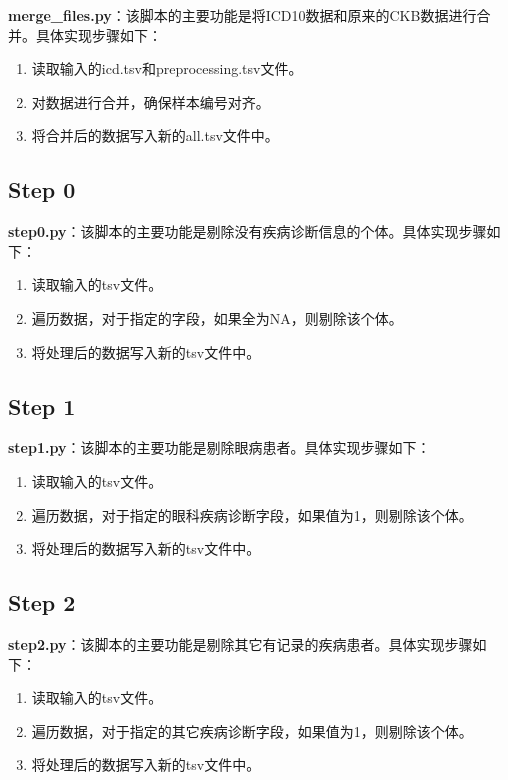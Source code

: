 \documentclass[UTF8]{report}
\theoremstyle{MyLineTheoremStyle} %
\theoremstyle{MyBlockTheoremStyle} %
\theoremstyle{MySubsubsectionStyle} %
\begin{document}
\textbf{merge\_files.py}：该脚本的主要功能是将ICD10数据和原来的CKB数据进行合并。具体实现步骤如下：
\begin{enumerate}
    \item 读取输入的icd.tsv和preprocessing.tsv文件。
    \item 对数据进行合并，确保样本编号对齐。
    \item 将合并后的数据写入新的all.tsv文件中。
\end{enumerate}

\subsection*{Step 0}

\textbf{step0.py}：该脚本的主要功能是剔除没有疾病诊断信息的个体。具体实现步骤如下：
\begin{enumerate}
    \item 读取输入的tsv文件。
    \item 遍历数据，对于指定的字段，如果全为NA，则剔除该个体。
    \item 将处理后的数据写入新的tsv文件中。
\end{enumerate}

\subsection*{Step 1}

\textbf{step1.py}：该脚本的主要功能是剔除眼病患者。具体实现步骤如下：
\begin{enumerate}
    \item 读取输入的tsv文件。
    \item 遍历数据，对于指定的眼科疾病诊断字段，如果值为1，则剔除该个体。
    \item 将处理后的数据写入新的tsv文件中。
\end{enumerate}

\subsection*{Step 2}

\textbf{step2.py}：该脚本的主要功能是剔除其它有记录的疾病患者。具体实现步骤如下：
\begin{enumerate}
    \item 读取输入的tsv文件。
    \item 遍历数据，对于指定的其它疾病诊断字段，如果值为1，则剔除该个体。
    \item 将处理后的数据写入新的tsv文件中。
\end{enumerate}
\end{document}
